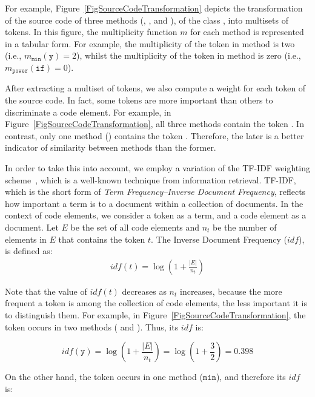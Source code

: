 For example, Figure~\ref{FigSourceCodeTransformation} depicts the transformation of the source code of three methods (, , and ), of the class , into multisets of tokens. In this figure, the multiplicity function $m$ for each method is represented in a tabular form. For example, the multiplicity of the token  in method  is two (i.e., $m_{\mathtt{min}}(\mathtt{y}) = 2$), whilst the multiplicity of the token  in method  is zero (i.e., $m_{\mathtt{power}}(\mathtt{if}) = 0$).

After extracting a multiset of tokens, we also compute a weight for each token
of the source code.
In fact, some tokens are more important than others to discriminate a code element.
For example, in Figure~\ref{FigSourceCodeTransformation}, all three methods contain the token . In contrast, only one method () contains the token . Therefore, the later is a better indicator of similarity between methods than the former.

In order to take this into account, we employ a variation of the TF-IDF weighting scheme~\cite{salton1986introduction}, which is a well-known technique from information retrieval.
TF-IDF, which is the short form of \emph{Term Frequency–Inverse Document Frequency}, reflects how important a term is to a document within a collection of documents.
In the context of code elements, we consider a token as a term, and a code element as a document.
Let $E$ be the set of all code elements and $n_t$ be the number of elements in $E$ that contains the token $t$. The Inverse Document Frequency ($\mathit{idf}$), is defined as:
\begin{align}
\mathit{idf}(t) = \log (1 + \frac{|E|}{n_t})
\end{align}

Note that the value of $\mathit{idf}(t)$ decreases as $n_t$ increases, because the more frequent a token is among the collection of code elements, the less important it is to distinguish them.
For example, in Figure~\ref{FigSourceCodeTransformation}, the token  occurs in two methods ( and ). Thus, its $\mathit{idf}$ is:

\[
\mathit{idf}(\mathtt{y}) = 
\log (1 + \frac{|E|}{n_t}) = 
\log (1 + \frac{3}{2}) = 0.398
\]

On the other hand, the token  occurs in one method ($\mathtt{min}$), and therefore its $\mathit{idf}$ is:

